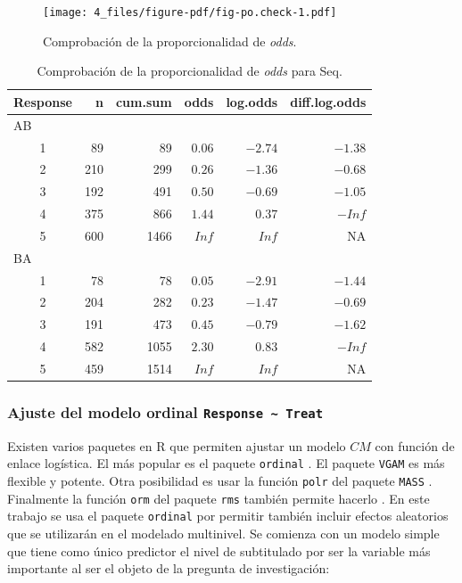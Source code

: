 \documentclass[
  12pt,
  a4paper,
  extrafontsizes,
  onecolumn,
  openright,
  table]{memoir}
\begin{document}
\clearpage

\begin{figure}[h]

{\centering \texttt{[image: 4\_files/figure-pdf/fig-po.check-1.pdf]}

}

\caption{\label{fig-po.check}Comprobación de la proporcionalidad de
\emph{odds}.}

\end{figure}

\hypertarget{tbl-po.check}{}
\begin{longtable}{crrrrr}
\caption{\label{tbl-po.check}Comprobación de la proporcionalidad de \emph{odds} para Seq. }\tabularnewline

\toprule
Response & n & cum.sum & odds & log.odds & diff.log.odds \\ 
\midrule
\multicolumn{6}{l}{AB} \\ 
\midrule
1 & 89 & 89 & $0.06$ & $-2.74$ & $-1.38$ \\ 
2 & 210 & 299 & $0.26$ & $-1.36$ & $-0.68$ \\ 
3 & 192 & 491 & $0.50$ & $-0.69$ & $-1.05$ \\ 
4 & 375 & 866 & $1.44$ & $0.37$ & $-Inf$ \\ 
5 & 600 & 1466 & $Inf$ & $Inf$ & NA \\ 
\midrule
\multicolumn{6}{l}{BA} \\ 
\midrule
1 & 78 & 78 & $0.05$ & $-2.91$ & $-1.44$ \\ 
2 & 204 & 282 & $0.23$ & $-1.47$ & $-0.69$ \\ 
3 & 191 & 473 & $0.45$ & $-0.79$ & $-1.62$ \\ 
4 & 582 & 1055 & $2.30$ & $0.83$ & $-Inf$ \\ 
5 & 459 & 1514 & $Inf$ & $Inf$ & NA \\ 
\bottomrule
\end{longtable}

\hypertarget{ajuste-del-modelo-ordinal-response-treat}{%
\subsubsection{\texorpdfstring{Ajuste del modelo ordinal
\texttt{Response\ \textasciitilde{}\ Treat}}{Ajuste del modelo ordinal Response \textasciitilde{} Treat}}\label{ajuste-del-modelo-ordinal-response-treat}}

Existen varios paquetes en R que permiten ajustar un modelo \(CM\) con
función de enlace logística. El más popular es el paquete
\texttt{ordinal} \autocite[ver][]{ordinalR}. El paquete \texttt{VGAM}
\autocite[ver][]{VGAMR} es más flexible y potente. Otra posibilidad es
usar la función \texttt{polr} del paquete \texttt{MASS}
\autocite[ver][]{MASSR}. Finalmente la función \texttt{orm} del paquete
\texttt{rms} también permite hacerlo \autocite[ver][]{harrell2015}. En
este trabajo se usa el paquete \texttt{ordinal}
\autocite[ver][]{ordinalR} por permitir también incluir efectos
aleatorios que se utilizarán en el modelado multinivel. Se comienza con
un modelo simple que tiene como único predictor el nivel de subtitulado
por ser la variable más importante al ser el objeto de la pregunta de
investigación:
\end{document}
